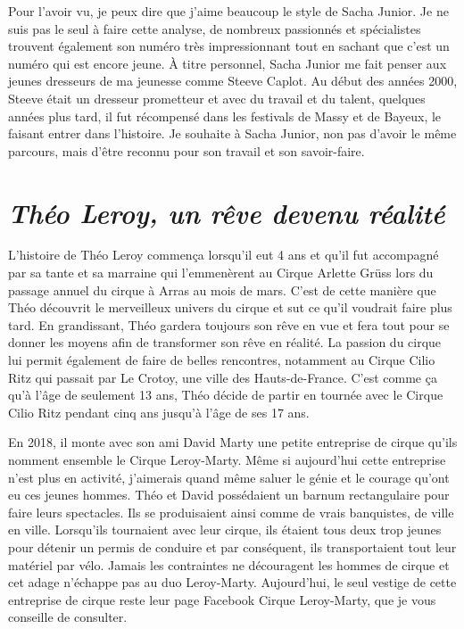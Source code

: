 Pour l'avoir vu, je peux dire que j'aime beaucoup le style de Sacha Junior. Je ne suis pas le seul à faire cette analyse, de nombreux passionnés et spécialistes trouvent également son numéro très impressionnant tout en sachant que c'est un numéro qui est encore jeune. À titre personnel, Sacha Junior me fait penser aux jeunes dresseurs de ma jeunesse comme Steeve Caplot. Au début des années 2000, Steeve était un dresseur prometteur et avec du travail et du talent, quelques années plus tard, il fut récompensé dans les festivals de Massy et de Bayeux, le faisant entrer dans l'histoire. Je souhaite à Sacha Junior, non pas d'avoir le même parcours, mais d'être reconnu pour son travail et son savoir-faire. 

\section*{\textit{Théo Leroy, un rêve devenu réalité }}
{}

L'histoire de Théo Leroy commença lorsqu’il eut 4 ans et qu'il fut accompagné par sa tante et sa marraine qui l'emmenèrent au Cirque Arlette Grüss lors du passage annuel du cirque à Arras au mois de mars. C'est de cette manière que Théo découvrit le merveilleux univers du cirque et sut ce qu'il voudrait faire plus tard. En grandissant, Théo gardera toujours son rêve en vue et fera tout pour se donner les moyens afin de transformer son rêve en réalité. La passion du cirque lui permit également de faire de belles rencontres, notamment au Cirque Cilio Ritz qui passait par Le Crotoy, une ville des Hauts-de-France. C'est comme ça qu'à l'âge de seulement 13 ans, Théo décide de partir en tournée avec le Cirque Cilio Ritz pendant cinq ans jusqu'à l'âge de ses 17 ans.

En 2018, il monte avec son ami David Marty une petite entreprise de cirque qu'ils nomment ensemble le Cirque Leroy-Marty. Même si aujourd'hui cette entreprise n'est plus en activité, j'aimerais quand même saluer le génie et le courage qu'ont eu ces jeunes hommes. Théo et David possédaient un barnum rectangulaire pour faire leurs spectacles. Ils se produisaient ainsi comme de vrais banquistes, de ville en ville. Lorsqu'ils tournaient avec leur cirque, ils étaient tous deux trop jeunes pour détenir un permis de conduire et par conséquent, ils transportaient tout leur matériel par vélo. Jamais les contraintes ne découragent les hommes de cirque et cet adage n'échappe pas au duo Leroy-Marty. Aujourd'hui, le seul vestige de cette entreprise de cirque reste leur page Facebook Cirque Leroy-Marty, que je vous conseille de consulter.

